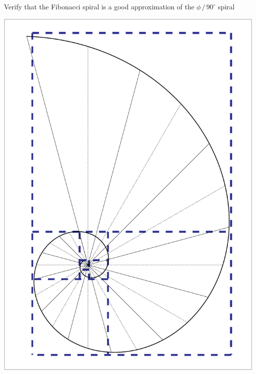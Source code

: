 \documentclass[a4paper,12pt]{article}
\begin{document}
    \begin{center}
    
        \large

        Verify that the Fibonacci spiral is a good approximation of the $\phi \, / \, 90^{\circ}$ spiral

        \bigskip \bigskip \bigskip
    
        \includegraphics[scale=0.7071]{./pictures/Example_11b}

    \end{center}

    \newpage

\end{document}
